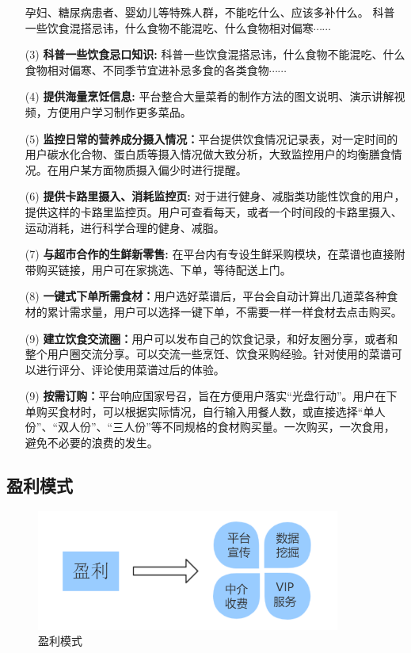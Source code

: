 \documentclass[UTF8,12pt]{ctexart}
\numberwithin{figure}{section}%
\begin{document}
\begin{spacing}{2}
\begin{enumerate}
	孕妇、糖尿病患者、婴幼儿等特殊人群，不能吃什么、应该多补什么。 科普一些饮食混搭忌讳，什么食物不能混吃、什么食物相对偏寒$\cdots \cdots$
	
	\item[(3)] \textbf{科普一些饮食忌口知识: } 科普一些饮食混搭忌讳，什么食物不能混吃、什么食物相对偏寒、不同季节宜进补忌多食的各类食物$\cdots \cdots$
	
	\item[(4)] \textbf{提供海量烹饪信息: }平台整合大量菜肴的制作方法的图文说明、演示讲解视频，方便用户学习制作更多菜品。
	
	\item[(5)] \textbf{监控日常的营养成分摄入情况：}平台提供饮食情况记录表，对一定时间的用户碳水化合物、蛋白质等摄入情况做大致分析，大致监控用户的均衡膳食情况。在用户某方面物质摄入偏少时进行提醒。
	
	\item[(6)] \textbf{提供卡路里摄入、消耗监控页: }对于进行健身、减脂类功能性饮食的用户，提供这样的卡路里监控页。用户可查看每天，或者一个时间段的卡路里摄入、运动消耗，进行科学合理的健身、减脂。
	
	\item[(7)] \textbf{与超市合作的生鲜新零售: }在平台内有专设生鲜采购模块，在菜谱也直接附带购买链接，用户可在家挑选、下单，等待配送上门。
	
	\item[(8)] \textbf{一键式下单所需食材：}用户选好菜谱后，平台会自动计算出几道菜各种食材的累计需求量，用户可以选择一键下单，不需要一样一样食材去点击购买。 
	
	\item[(9)] \textbf{建立饮食交流圈：}用户可以发布自己的饮食记录，和好友圈分享，或者和整个用户圈交流分享。可以交流一些烹饪、饮食采购经验。针对使用的菜谱可以进行评分、评论使用菜谱过后的体验。
	
	\item[(9)] \textbf{按需订购：}平台响应国家号召，旨在方便用户落实“光盘行动”。用户在下单购买食材时，可以根据实际情况，自行输入用餐人数，或直接选择“单人份”、“双人份”、“三人份”等不同规格的食材购买量。一次购买，一次食用，避免不必要的浪费的发生。
	
\end{enumerate}


\newpage
\subsection{盈利模式}

\begin{figure}[!htb]
	\centering
	\includegraphics[width=10cm]{fig/1}
	\caption{盈利模式}
\end{figure}


\end{spacing}
\end{document}

